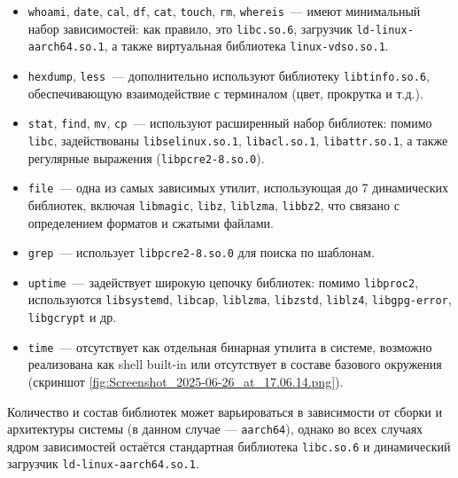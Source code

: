 \begin{itemize}
    \item \texttt{whoami}, \texttt{date}, \texttt{cal}, \texttt{df}, \texttt{cat}, \texttt{touch}, \texttt{rm}, \texttt{whereis}~--- имеют минимальный набор зависимостей: как правило, это \texttt{libc.so.6}, загрузчик \break\texttt{ld-linux-aarch64.so.1}, а также виртуальная библиотека \break\texttt{linux-vdso.so.1}.

    \item \texttt{hexdump}, \texttt{less}~--- дополнительно используют библиотеку \texttt{libtinfo.so.6}, обеспечивающую взаимодействие с терминалом (цвет, прокрутка и т.д.).

    \item \texttt{stat}, \texttt{find}, \texttt{mv}, \texttt{cp}~--- используют расширенный набор библиотек: помимо \texttt{libc}, задействованы \texttt{libselinux.so.1}, \texttt{libacl.so.1}, \texttt{libattr.so.1}, а также регулярные выражения (\texttt{libpcre2-8.so.0}).

    \item \texttt{file}~— одна из самых зависимых утилит, использующая до 7 динамических библиотек, включая \texttt{libmagic}, \texttt{libz}, \texttt{liblzma}, \texttt{libbz2}, что связано с определением форматов и сжатыми файлами.

    \item \texttt{grep}~— использует \texttt{libpcre2-8.so.0} для поиска по шаблонам.

    \item \texttt{uptime}~— задействует широкую цепочку библиотек: помимо \texttt{libproc2}, используются \texttt{libsystemd}, \texttt{libcap}, \texttt{liblzma}, \texttt{libzstd}, \texttt{liblz4}, \texttt{libgpg-error}, \texttt{libgcrypt} и др.

    \item \texttt{time}~— отсутствует как отдельная бинарная утилита в системе, возможно реализована как shell built-in или отсутствует в составе базового окружения (скриншот \ref{fig:Screenshot_2025-06-26_at_17.06.14.png}).
\end{itemize}


Количество и состав библиотек может варьироваться в зависимости от сборки и архитектуры системы (в данном случае — \texttt{aarch64}), однако во всех случаях ядром зависимостей остаётся стандартная библиотека \texttt{libc.so.6} и динамический загрузчик \texttt{ld-linux-aarch64.so.1}.

